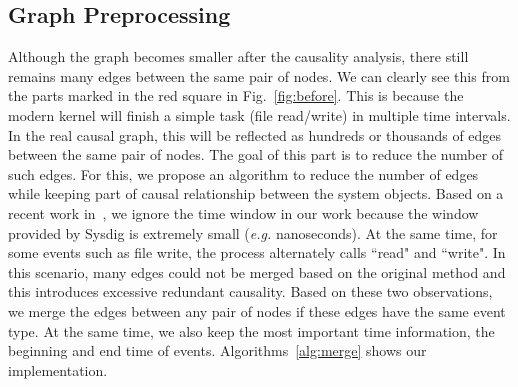 \subsection{Graph Preprocessing}
\label{subsec:edge-merge}


Although the graph becomes smaller after the causality analysis, there still remains many edges between the same pair of nodes. We can clearly see this from the parts marked in the red square in Fig.~\ref{fig:before}. This is because the modern kernel will finish a simple task (\eg file read/write) in multiple time intervals. In the real causal graph, this will be reflected as hundreds or thousands of edges between the same pair of nodes. The goal of this part is to reduce the number of such edges.  For this, we propose an algorithm to reduce the number of edges while keeping part of causal relationship between the system objects. Based on a recent work in~\cite{reduction}, we ignore the time window in our work because the window provided by Sysdig is extremely small  (\textit{e.g.} nanoseconds). At the same time, for some events such as file write, the process alternately calls ``read" and ``write". In this scenario, many edges could not be merged based on the original method and this introduces excessive redundant causality. Based on these two observations, we merge the edges between any pair of nodes if these edges have the same event type. At the same time, we also keep the most important time information, the beginning and end time of events. Algorithms~\ref{alg:merge} shows our implementation.





